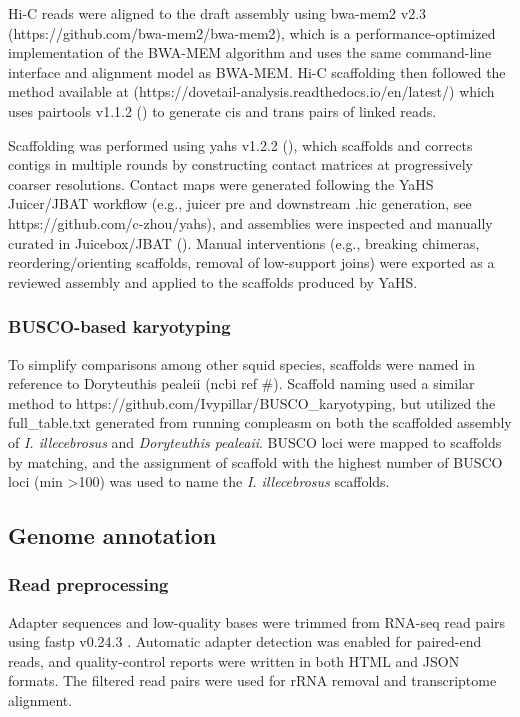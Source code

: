 \documentclass[11pt]{article}
\begin{document}
Hi-C reads were aligned to the draft assembly using bwa-mem2 v2.3 (https://github.com/bwa-mem2/bwa-mem2), which is a performance-optimized implementation of the BWA-MEM algorithm and uses the same command-line interface and alignment model as BWA-MEM. Hi-C scaffolding then followed the method available at (https://dovetail-analysis.readthedocs.io/en/latest/) which uses pairtools v1.1.2 (\cite{Open2C2024Pairtools}) to generate cis and trans pairs of linked reads. 

Scaffolding was performed using yahs v1.2.2 (\cite{Zhou2023YaHS}), which scaffolds and corrects contigs in multiple rounds by constructing contact matrices at progressively coarser resolutions. Contact maps were generated following the YaHS Juicer/JBAT workflow (e.g., juicer pre and downstream .hic generation, see https://github.com/c-zhou/yahs), and assemblies were inspected and manually curated in Juicebox/JBAT (\cite{Durand2016Juicebox}). Manual interventions (e.g., breaking chimeras, reordering/orienting scaffolds, removal of low-support joins) were exported as a reviewed assembly and applied to the scaffolds produced by YaHS.

\subsubsection{BUSCO-based karyotyping}

To simplify comparisons among other squid species, scaffolds were named in reference to Doryteuthis pealeii (ncbi ref \#). Scaffold naming used a similar method to https://github.com/Ivypillar/BUSCO\_karyotyping, but utilized the full\_table.txt generated from running compleasm on both the scaffolded assembly of \textit{I. illecebrosus} and \textit{Doryteuthis pealeaii}. BUSCO loci were mapped to scaffolds by matching, and the assignment of scaffold with the highest number of BUSCO loci (min >100) was used to name the \textit{I. illecebrosus} scaffolds. 

\subsection{Genome annotation}

\subsubsection{Read preprocessing}

Adapter sequences and low-quality bases were trimmed from RNA-seq read pairs using fastp v0.24.3 \cite{Chenfastp}. Automatic adapter detection was enabled for paired-end reads, and quality-control reports were written in both HTML and JSON formats. The filtered read pairs were used for rRNA removal and transcriptome alignment.
\end{document}
